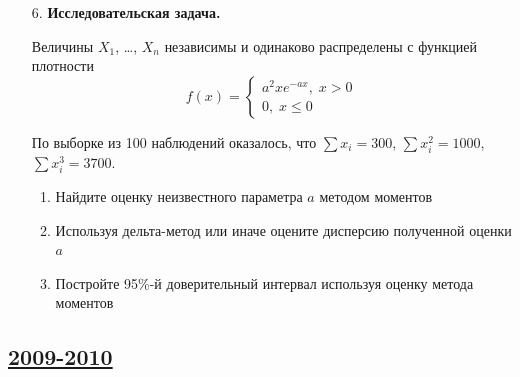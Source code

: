 \begin{enumerate}
\item[6.] \textbf{Исследовательская задача.}

Величины $X_1$, \ldots, $X_n$ независимы и одинаково распределены с функцией плотности
\[
f(x)=\begin{cases}
a^2xe^{-ax}, \; x>0 \\
0, \; x\leq 0
\end{cases}
\]

По выборке из 100 наблюдений оказалось, что $\sum x_i =300$, $\sum x_i^2=1000$,
$\sum x_i^3=3700$.

\begin{enumerate}
\item Найдите оценку неизвестного параметра $a$ методом моментов
\item Используя дельта-метод или иначе оцените дисперсию полученной оценки $a$
\item Постройте 95\%-й доверительный интервал используя оценку метода моментов
\end{enumerate}
\end{enumerate}



\subsection[2009-2010]{\hyperref[sec:sol_kr_04_2009_2010]{2009-2010}}
\label{sec:kr_04_2009_2010}



